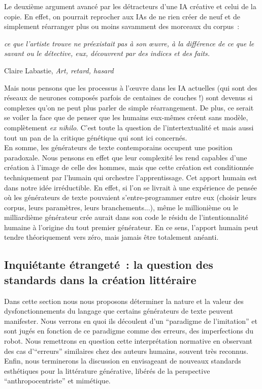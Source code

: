 \documentclass{article}
\newenvironment{citationbox}
{\begin{center}
		\begin{minipage}{.8\textwidth}
		}
		{
		\end{minipage}	
\end{center}
}
\begin{document}
				Le deuxième argument avancé par les détracteurs d'une IA créative et celui de la copie. En effet, on pourrait reprocher aux IAs de ne rien créer de neuf et de simplement réarranger plus ou moins savamment des morceaux du corpus~:
				\begin{citationbox}
					\textit{ce que l'artiste trouve ne
						préexistait pas à son œuvre, à la différence de ce que le savant ou le détective, eux,
						découvrent par des indices et des faits.}
					\begin{flushright}
						Claire Labastie, \textit{Art, retard, hasard} \cite{labastie2016}
					\end{flushright}
				\end{citationbox}
				Mais nous pensons que les processus à l'œuvre dans les IA actuelles (qui sont des réseaux de neurones composés parfois de centaines de couches !) sont devenus si complexes qu'on ne peut plus parler de simple réarrangement. De plus, ce serait se voiler la face que de penser que les humains eux-mêmes créent sans modèle, complètement \textit{ex nihilo}. C'est toute la question de l'intertextualité et mais aussi tout un pan de la critique génétique qui sont ici concernés.\\
				
				
				En somme, les générateurs de texte contemporains occupent une position paradoxale. Nous pensons en effet que leur complexité les rend capables d'une création à l'image de celle des hommes, mais que cette création est conditionnée techniquement par l'humain qui orchestre l'apprentissage. Cet apport humain est dans notre idée irréductible. En effet, si l'on se livrait à une expérience de pensée où les générateurs de texte pouvaient s'entre-programmer entre eux (choisir leurs corpus, leurs paramètres, leurs branchements...), même le millionième ou le milliardième générateur crée aurait dans son code le résidu de l'intentionnalité humaine à l'origine du tout premier générateur. En ce sens, l'apport humain peut tendre théoriquement vers zéro, mais jamais être totalement anéanti.
				
				
				

		\subsection{Inquiétante étrangeté~: la question des standards dans la création littéraire}
			Dans cette section nous nous proposons déterminer la nature et la valeur des dysfonctionnements du langage que certains générateurs de texte peuvent manifester. Nous verrons en quoi ils découlent d'un ``paradigme de l'imitation'' et sont jugés en fonction de ce paradigme comme des erreurs, des imperfections du robot. Nous remettrons en question cette interprétation normative en observant des cas d'``erreurs'' similaires chez des auteurs humains, souvent très reconnus. Enfin, nous terminerons la discussion en envisageant de nouveaux standards esthétiques pour la littérature générative, libérés de la perspective ``anthropocentriste'' et mimétique.
\end{document}
